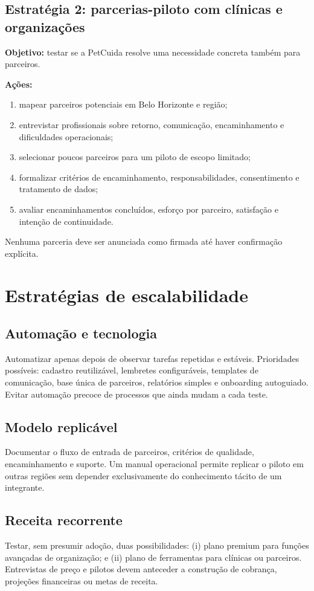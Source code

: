 \documentclass[12pt,a4paper]{article}
\begin{document}
\subsection{Estratégia 2: parcerias-piloto com clínicas e organizações}
\textbf{Objetivo:} testar se a PetCuida resolve uma necessidade concreta também para parceiros.

\textbf{Ações:}
\begin{enumerate}[leftmargin=*]
\item mapear parceiros potenciais em Belo Horizonte e região;
\item entrevistar profissionais sobre retorno, comunicação, encaminhamento e dificuldades operacionais;
\item selecionar poucos parceiros para um piloto de escopo limitado;
\item formalizar critérios de encaminhamento, responsabilidades, consentimento e tratamento de dados;
\item avaliar encaminhamentos concluídos, esforço por parceiro, satisfação e intenção de continuidade.
\end{enumerate}
Nenhuma parceria deve ser anunciada como firmada até haver confirmação explícita.

\section{Estratégias de escalabilidade}
\subsection{Automação e tecnologia}
Automatizar apenas depois de observar tarefas repetidas e estáveis. Prioridades possíveis: cadastro reutilizável, lembretes configuráveis, templates de comunicação, base única de parceiros, relatórios simples e onboarding autoguiado. Evitar automação precoce de processos que ainda mudam a cada teste.

\subsection{Modelo replicável}
Documentar o fluxo de entrada de parceiros, critérios de qualidade, encaminhamento e suporte. Um manual operacional permite replicar o piloto em outras regiões sem depender exclusivamente do conhecimento tácito de um integrante.

\subsection{Receita recorrente}
Testar, sem presumir adoção, duas possibilidades: (i) plano premium para funções avançadas de organização; e (ii) plano de ferramentas para clínicas ou parceiros. Entrevistas de preço e pilotos devem anteceder a construção de cobrança, projeções financeiras ou metas de receita.
\end{document}
